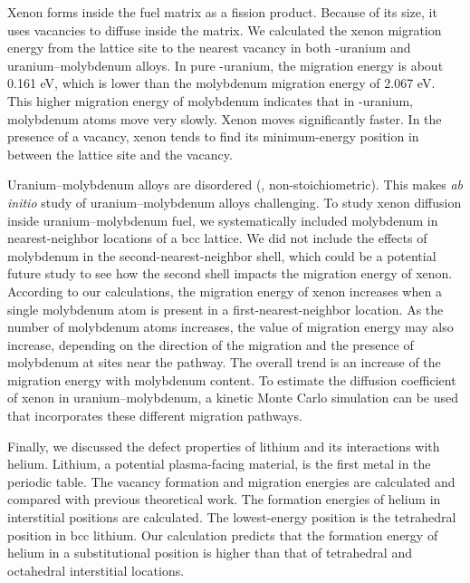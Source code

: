 Xenon forms inside the fuel matrix as a fission product. Because of its size, it uses vacancies to diffuse inside the matrix. We calculated the xenon migration energy from the lattice site to the nearest vacancy in both \textgamma-uranium and uranium--molybdenum alloys. In pure \textgamma-uranium, the migration energy is about 0.161 eV, which is lower than the molybdenum migration energy of 2.067 eV. This higher migration energy of molybdenum indicates that in \textgamma-uranium, molybdenum atoms move very slowly. Xenon moves significantly faster. In the presence of a vacancy, xenon tends to find its minimum-energy position in between the lattice site and the vacancy. 

Uranium--molybdenum alloys are disordered (\ie, non-stoichiometric). This makes \textit{ab initio} study of uranium--molybdenum alloys challenging. To study xenon diffusion inside uranium--molybdenum fuel, we systematically included molybdenum in nearest-neighbor locations of a bcc lattice. We did not include the effects of molybdenum in the second-nearest-neighbor shell, which could be a potential future study to see how the second shell impacts the migration energy of xenon. According to our calculations, the migration energy of xenon increases when a single molybdenum atom is present in a first-nearest-neighbor location. As the number of molybdenum atoms increases, the value of migration energy may also increase, depending on the direction of the migration and the presence of molybdenum at sites near the pathway. The overall trend is an increase of the migration energy with molybdenum content. To estimate the diffusion coefficient of xenon in uranium--molybdenum, a kinetic Monte Carlo simulation can be used that incorporates these different migration pathways.
 

Finally, we discussed the defect properties of lithium and its interactions with helium. Lithium, a potential plasma-facing material, is the first metal in the periodic table. The vacancy formation and migration energies are calculated and compared with previous theoretical work. The formation energies of helium in interstitial positions are calculated. The lowest-energy position is the tetrahedral position in bcc lithium. Our calculation predicts that the formation energy of helium in a substitutional position is higher than that of tetrahedral and octahedral interstitial locations.

